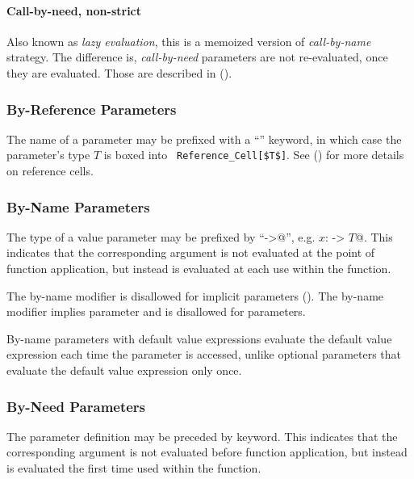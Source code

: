 \paragraph{Call-by-need, non-strict}
Also known as {\em lazy evaluation}, this is a memoized version of {\em call-by-name} strategy. The difference is, {\em call-by-need} parameters are not re-evaluated, once they are evaluated. Those are described in ().





\subsubsection{By-Reference Parameters}
\label{sec:by-ref-parameters}

The name of a parameter may be prefixed with a ``'' keyword, in which case the parameter's type $T$ is boxed into ~\lstinline!Reference_Cell[$T$]!. See () for more details on reference cells. 





\subsubsection{By-Name Parameters}
\label{sec:by-name-parameters}

The type of a value parameter may be prefixed by ``\lstinline@->@'', e.g. \lstinline@$x$: -> $T$@. This indicates that the corresponding argument is not evaluated at the point of function application, but instead is evaluated at each use within the function.

The by-name modifier is disallowed for implicit parameters (). The by-name modifier implies  parameter and is disallowed for  parameters. 

By-name parameters with default value expressions evaluate the default value expression each time the parameter is accessed, unlike optional parameters that evaluate the default value expression only once. 






\subsubsection{By-Need Parameters}
\label{sec:by-need-parameters}

The parameter definition may be preceded by  keyword. This indicates that the corresponding argument is not evaluated before function application, but instead is evaluated the first time used within the function. 

